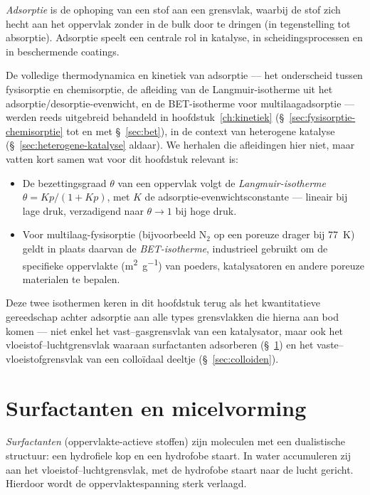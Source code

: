 \emph{Adsorptie} is de ophoping van een stof aan een grensvlak, waarbij de stof zich hecht aan het oppervlak zonder in de bulk door te dringen (in tegenstelling tot absorptie). Adsorptie speelt een centrale rol in katalyse, in scheidingsprocessen en in beschermende coatings.

De volledige thermodynamica en kinetiek van adsorptie --- het onderscheid tussen fysisorptie en chemisorptie, de afleiding van de Langmuir-isotherme uit het adsorptie/desorptie-evenwicht, en de BET-isotherme voor multilaagadsorptie --- werden reeds uitgebreid behandeld in hoofdstuk~\ref{ch:kinetiek} (\S~\ref{sec:fysisorptie-chemisorptie} tot en met \S~\ref{sec:bet}), in de context van heterogene katalyse (\S~\ref{sec:heterogene-katalyse} aldaar). We herhalen die afleidingen hier niet, maar vatten kort samen wat voor dit hoofdstuk relevant is:
\begin{itemize}
\item De bezettingsgraad $\theta$ van een oppervlak volgt de \emph{Langmuir-isotherme} $\theta = Kp/(1+Kp)$, met $K$ de adsorptie-evenwichtsconstante --- lineair bij lage druk, verzadigend naar $\theta\to1$ bij hoge druk.
\item Voor multilaag-fysisorptie (bijvoorbeeld $\mathrm{N_2}$ op een poreuze drager bij \SI{77}{\kelvin}) geldt in plaats daarvan de \emph{BET-isotherme}, industrieel gebruikt om de specifieke oppervlakte (\si{\metre\squared\per\gram}) van poeders, katalysatoren en andere poreuze materialen te bepalen.
\end{itemize}
Deze twee isothermen keren in dit hoofdstuk terug als het kwantitatieve gereedschap achter adsorptie aan alle types grensvlakken die hierna aan bod komen --- niet enkel het vast--gasgrensvlak van een katalysator, maar ook het vloeistof--luchtgrensvlak waaraan surfactanten adsorberen (\S~\ref{sec:surfactanten}) en het vaste--vloeistofgrensvlak van een collo\"idaal deeltje (\S~\ref{sec:colloiden}).

\section{Surfactanten en micelvorming}
\label{sec:surfactanten}

\emph{Surfactanten} (oppervlakte-actieve stoffen) zijn moleculen met een dualistische structuur: een hydrofiele kop en een hydrofobe staart. In water accumuleren zij aan het vloeistof--luchtgrensvlak, met de hydrofobe staart naar de lucht gericht. Hierdoor wordt de oppervlaktespanning sterk verlaagd.

